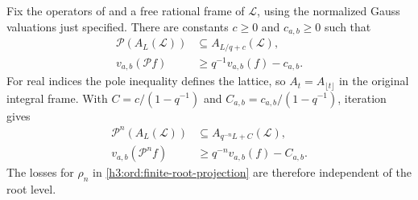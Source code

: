 \begin{lemma}\label{h3:ord:loss-bounds}
Fix the operators of  and a free rational
frame of $\mathcal L$, using the normalized Gauss valuations just
specified.  There are constants $c\geq0$ and
$c_{a,b}\geq0$ such that
\begin{align}
 \mathcal P(A_L(\mathcal L))
   &\subseteq A_{L/q+c}(\mathcal L),\label{h3:ord:one-pole-bound}\\
 v_{a,b}(\mathcal Pf)
   &\geq q^{-1}v_{a,b}(f)-c_{a,b}.
   \label{h3:ord:one-norm-bound}
\end{align}
For real indices the pole inequality defines the lattice, so
$A_t=A_{\lfloor t\rfloor}$ in the original integral frame.  With
$C=c/(1-q^{-1})$ and $C_{a,b}=c_{a,b}/(1-q^{-1})$, iteration gives
\begin{align}
 \mathcal P^n(A_L(\mathcal L))
   &\subseteq A_{q^{-n}L+C}(\mathcal L),\label{h3:ord:iterated-poles}\\
 v_{a,b}(\mathcal P^nf)
   &\geq q^{-n}v_{a,b}(f)-C_{a,b}.
   \label{h3:ord:iterated-norms}
\end{align}
The losses for $\rho_n$ in \eqref{h3:ord:finite-root-projection} are
therefore independent of the root level.
\end{lemma}

